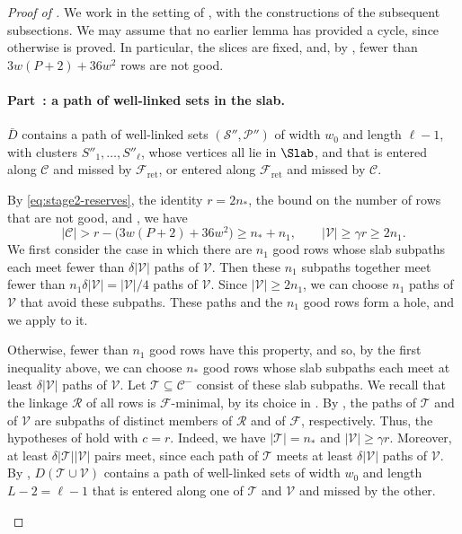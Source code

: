\documentclass[fontsize=12pt,leading=14pt]{fullpaper}
\newcommand{\Ccal}{\mathcal{C}}
\newcommand{\Fcal}{\mathcal{F}}
\newcommand{\Pcal}{\mathcal{P}}
\newcommand{\Rcal}{\mathcal{R}}
\newcommand{\Scal}{\mathcal{S}}
\newcommand{\Tcal}{\mathcal{T}}
\newcommand{\Vcal}{\mathcal{V}}
\newcounter{step}
\newcounter{proofstep}[section]
\newcommand{\proofstep}[2]{%
\paragraph*{\refstepcounter{proofstep}\label{#1}Part~\theproofstep: #2}}
\begin{document}
\begin{proof}[Proof of ]
  We work in the setting of , with the constructions of the subsequent subsections.
  We may assume that no earlier lemma has provided a cycle, since otherwise  is proved.
  In particular, the slices are fixed, and, by , fewer than $3w(P+2)+36w^2$ rows are not good.

  \proofstep{part:closing-1}{a path of well-linked sets in the slab.}
  \begin{claim}\label{clm:stage2-step1}
    $\bar D$ contains a path of well-linked sets $(\Scal'',\Pcal'')$ of width $w_0$ and length $\ell-1$, with clusters $S''_1,\dots,S''_\ell$, whose vertices all lie in $\Slab$, and that is entered along $\Ccal$ and missed by $\Fcal_{\mathrm{ret}}$, or entered along $\Fcal_{\mathrm{ret}}$ and missed by $\Ccal$.
  \end{claim}

  \begin{cproof}
    By \eqref{eq:stage2-reserves}, the identity $r=2n_*$, the bound on the number of rows that are not good, and , we have
    \[
      |\Ccal|>r-\bigl(3w(P+2)+36w^2\bigr)\ge n_*+n_1,
      \qquad |\Vcal|\ge\gamma r\ge2n_1.
    \]
    We first consider the case in which there are $n_1$ good rows whose slab subpaths each meet fewer than $\delta|\Vcal|$ paths of $\Vcal$.
    Then these $n_1$ subpaths together meet fewer than $n_1\delta|\Vcal|=|\Vcal|/4$ paths of $\Vcal$.
    Since $|\Vcal|\ge2n_1$, we can choose $n_1$ paths of $\Vcal$ that avoid these subpaths.
    These paths and the $n_1$ good rows form a hole, and we apply  to it.

    Otherwise, fewer than $n_1$ good rows have this property, and so, by the first inequality above, we can choose $n_*$ good rows whose slab subpaths each meet at least $\delta|\Vcal|$ paths of $\Vcal$.
    Let $\Tcal\subseteq\Ccal^-$ consist of these slab subpaths.
    We recall that the linkage $\Rcal$ of all rows is $\Fcal$-minimal, by its choice in .
    By , the paths of $\Tcal$ and of $\Vcal$ are subpaths of distinct members of $\Rcal$ and of $\Fcal$, respectively.
    Thus, the hypotheses of  hold with $c=r$.
    Indeed, we have $|\Tcal|=n_*$ and $|\Vcal|\ge\gamma r$.
    Moreover, at least $\delta|\Tcal||\Vcal|$ pairs meet, since each path of $\Tcal$ meets at least $\delta|\Vcal|$ paths of $\Vcal$.
    By , $D(\Tcal\cup\Vcal)$ contains a path of well-linked sets of width $w_0$ and length $L-2=\ell-1$ that is entered along one of $\Tcal$ and $\Vcal$ and missed by the other.


\end{cproof}
\end{proof}
\end{document}
